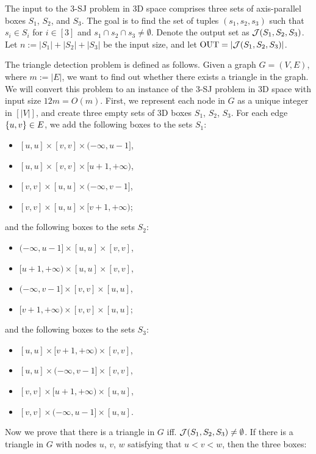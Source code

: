 The input to the 3-SJ problem in 3D space comprises
 three sets of axis-parallel boxes $S_1$, $S_2$, and $S_3$. 
The goal is to find the set of tuples $(s_1,s_2,s_3)$ such that $s_i \in S_i$ for $i \in [3]$ and $s_1 \cap s_2 \cap s_3 \neq \emptyset$. Denote the output set as $\mathcal{J}(S_1,S_2,S_3)$.
Let $n:=|S_1|+|S_2|+|S_3|$ be the input size, and let $\mathrm{OUT} = |\mathcal{J}(S_1,S_2,S_3)|$.

The triangle detection problem is defined as follows. Given a graph $G = (V,E)$, where $m:=|E|$, we want to find out whether there exists a triangle in the graph. We will convert this problem to an instance of the 3-SJ problem in 3D space with input size $12m=O(m)$. First, we represent each node in $G$ as a unique integer in $[|V|]$, and create three empty sets of 3D boxes $S_1$, $S_2$, $S_3$. For each edge $\{u,v\}\in E$, we add the following boxes to the sets $S_1$:
\begin{itemize}
    \item $[u,u]\times [v,v]\times(-\infty,u-1]$,
    \item $[u,u]\times [v,v]\times[u+1,+\infty)$,
    \item $[v,v]\times [u,u] \times (-\infty,v-1]$,
    \item $[v,v]\times [u,u] \times [v+1,+\infty)$;
\end{itemize}
and the following boxes to the sets $S_2$:
\begin{itemize}
    \item $(-\infty,u-1]\times[u,u]\times [v,v]$,
    \item $[u+1,+\infty)\times[u,u]\times [v,v]$,
    \item $(-\infty,v-1] \times[v,v]\times [u,u]$,
    \item $ [v+1,+\infty)\times [v,v]\times [u,u]$;
\end{itemize}
and the following boxes to the sets $S_3$:
\begin{itemize}
    \item $[u,u]\times[v+1,+\infty)\times [v,v]$,
    \item $[u,u]\times(-\infty,v-1]\times [v,v]$,
    \item $[v,v]\times[u+1,+\infty)\times [u,u]$,
    \item $[v,v]\times(-\infty,u-1]\times [u,u]$.
\end{itemize}
Now we prove that there is a triangle in $G$ iff.
 $\mathcal{J}(S_1,S_2,S_3) \neq \emptyset$. If there is a triangle in $G$ with nodes $u$, $v$, $w$  satisfying that $u < v < w$, then the three boxes:
